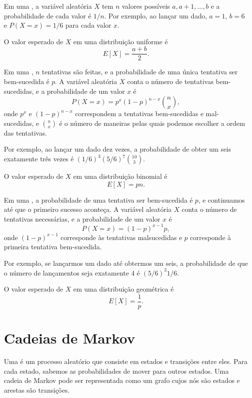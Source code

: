 Em uma ,
a variável aleatória $X$ tem $n$ valores possíveis
$a,a+1,\ldots,b$ e a probabilidade de cada valor é $1/n$.
Por exemplo, ao lançar um dado,
$a=1$, $b=6$ e $P(X=x)=1/6$ para cada valor $x$.

O valor esperado de $X$ em uma distribuição uniforme é
\[E[X] = \frac{a+b}{2}.\]

Em uma , $n$ tentativas
são feitas,
e a probabilidade de uma única tentativa ser bem-sucedida
é $p$.
A variável aleatória $X$ conta o número de
tentativas bem-sucedidas,
e a probabilidade de um valor $x$ é
\[P(X=x)=p^x (1-p)^{n-x} {n \choose x},\]
onde $p^x$ e $(1-p)^{n-x}$ correspondem a
tentativas bem-sucedidas e mal-sucedidas,
e ${n \choose x}$ é o número de maneiras
pelas quais podemos escolher a ordem das tentativas.

Por exemplo, ao lançar um dado dez vezes,
a probabilidade de obter um seis exatamente
três vezes é $(1/6)^3 (5/6)^7 {10 \choose 3}$.

O valor esperado de $X$ em uma distribuição binomial é
\[E[X] = pn.\]

Em uma ,
a probabilidade de uma tentativa ser bem-sucedida é $p$,
e continuamos até que o primeiro sucesso aconteça.
A variável aleatória $X$ conta o número
de tentativas necessárias, e a probabilidade de
um valor $x$ é
\[P(X=x)=(1-p)^{x-1} p,\]
onde $(1-p)^{x-1}$ corresponde às tentativas malsucedidas
e $p$ corresponde à primeira tentativa bem-sucedida.

Por exemplo, se lançarmos um dado até obtermos um seis,
a probabilidade de que o número de lançamentos
seja exatamente 4 é $(5/6)^3 1/6$.

O valor esperado de $X$ em uma distribuição geométrica é
\[E[X]=\frac{1}{p}.\]

\section{Cadeias de Markov}


Uma 
é um processo aleatório
que consiste em estados e transições entre eles.
Para cada estado, sabemos as probabilidades
de mover para outros estados.
Uma cadeia de Markov pode ser representada como um grafo
cujos nós são estados e arestas são transições.

